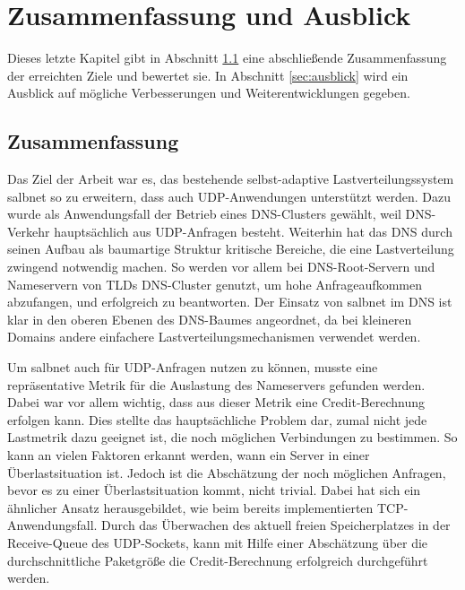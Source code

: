 \documentclass[a4paper, 12pt, BCOR10mm, DIV12, toc=bibliography, toc=listof, german]{scrbook}
\begin{document}

	\chapter{Zusammenfassung und Ausblick} %
	\label{cha:zusammenfassung}

	Dieses letzte Kapitel gibt in Abschnitt \ref{sec:zusammenfassung} eine abschließende
	Zusammenfassung der erreichten Ziele und bewertet sie. In Abschnitt \ref{sec:ausblick} wird ein
	Ausblick auf mögliche Verbesserungen und Weiterentwicklungen gegeben.

		\section{Zusammenfassung} %
		\label{sec:zusammenfassung}

		Das Ziel der Arbeit war es, das bestehende selbst-adaptive Lastverteilungssystem salbnet so zu
		erweitern, dass auch UDP-Anwendungen unterstützt werden. Dazu wurde als Anwendungsfall der Betrieb
		eines DNS-Clusters gewählt, weil DNS-Verkehr hauptsächlich aus UDP-Anfragen besteht. Weiterhin hat
		das DNS durch seinen Aufbau als baumartige Struktur kritische Bereiche, die eine Lastverteilung
		zwingend notwendig machen. So werden vor allem bei DNS-Root-Servern und Nameservern von
		TLDs DNS-Cluster genutzt, um hohe Anfrageaufkommen abzufangen, und erfolgreich zu beantworten. Der
		Einsatz von salbnet im DNS ist klar in den oberen Ebenen des DNS-Baumes angeordnet, da bei
		kleineren Domains andere einfachere Lastverteilungsmechanismen verwendet werden.

		Um salbnet auch für UDP-Anfragen nutzen zu können, musste eine repräsentative Metrik für die
		Auslastung des Nameservers gefunden werden. Dabei war vor allem wichtig, dass aus dieser Metrik
		eine Credit-Berechnung erfolgen kann. Dies stellte das hauptsächliche Problem dar, zumal nicht jede
		Lastmetrik dazu geeignet ist, die noch möglichen Verbindungen zu bestimmen. So kann an vielen
		Faktoren erkannt werden, wann ein Server in einer Überlastsituation ist. Jedoch ist die
		Abschätzung der noch möglichen Anfragen, bevor es zu einer Überlastsituation kommt, nicht
		trivial. Dabei hat sich ein ähnlicher Ansatz herausgebildet, wie beim bereits implementierten
		TCP-Anwendungsfall. Durch das Überwachen des aktuell freien Speicherplatzes in der Receive-Queue
		des UDP-Sockets, kann mit Hilfe einer Abschätzung über die durchschnittliche Paketgröße die
		Credit-Berechnung erfolgreich durchgeführt werden.
\end{document}
